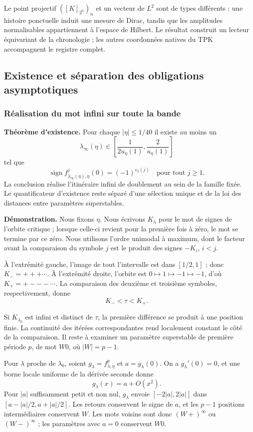Le point projectif \(([K]_{2^n})_n\) et un vecteur de \(L^2\) sont de types différents : une histoire ponctuelle induit une mesure de Dirac, tandis que les amplitudes normalisables appartiennent à l’espace de Hilbert. Le résultat construit un lecteur équivariant de la chronologie ; les autres coordonnées natives du TPK accompagnent le registre complet.


\subsection{Existence et séparation des obligations asymptotiques}
\label{hmtfg:prolongacion:6}

\subsubsection{Réalisation du mot infini sur toute la bande}
\label{hmtfg:prolongacion:6.1}

\textbf{Théorème d’existence.} Pour chaque \(|\eta|\le1/40\) il existe au moins un
\[
\lambda_\infty(\eta)\in
\left[\frac1{2u_\eta(1)},\frac2{u_\eta(1)}\right]
\]
tel que
\[
\boxed{\operatorname{sign}f_{\lambda_\infty(\eta),\eta}^{j}(0)
=(-1)^{v_2(j)}\quad\text{pour tout }j\ge1.}
\]
La conclusion réalise l’itinéraire infini de doublement au sein de la famille fixée. Le quantificateur d’existence reste séparé d’une sélection unique et de la loi des distances entre paramètres superstables.

\textbf{Démonstration.} Nous fixons \(\eta\). Nous écrivons \(K_\lambda\) pour le mot de signes de l’orbite critique ; lorsque celle-ci revient pour la première fois à zéro, le mot se termine par ce zéro. Nous utilisons l’ordre unimodal à maximum, dont le facteur avant la comparaison du symbole \(j\) est le produit des signes \(-K_i\), \(i<j\).

À l’extrémité gauche, l’image de tout l’intervalle est dans \([1/2,1]\) ; donc \(K_-=+++\cdots\). À l’extrémité droite, l’orbite est \(0\mapsto1\mapsto-1\mapsto-1\), d’où \(K_+=+---\cdots\). La comparaison des deuxième et troisième symboles, respectivement, donne
\[
K_-<\tau<K_+.
\]

Si \(K_{\lambda_0}\) est infini et distinct de \(\tau\), la première différence se produit à une position finie. La continuité des itérées correspondantes rend localement constant le côté de la comparaison. Il reste à examiner un paramètre superstable de première période \(p\), de mot \(W0\), où \(|W|=p-1\).

Pour \(\lambda\) proche de \(\lambda_0\), soient \(g_\lambda=f_{\lambda,\eta}^p\) et \(a=g_\lambda(0)\). On a \(g_\lambda'(0)=0\), et une borne locale uniforme de la dérivée seconde donne
\[
g_\lambda(x)=a+O(x^2).
\]
Pour \(|a|\) suffisamment petit et non nul, \(g_\lambda\) envoie \([-2|a|,2|a|]\) dans \([a-|a|/2,a+|a|/2]\). Les retours conservent le signe de \(a\), et les \(p-1\) positions intermédiaires conservent \(W\). Les mots voisins sont donc \((W+)^\infty\) ou \((W-)^\infty\) ; les paramètres avec \(a=0\) conservent \(W0\).

